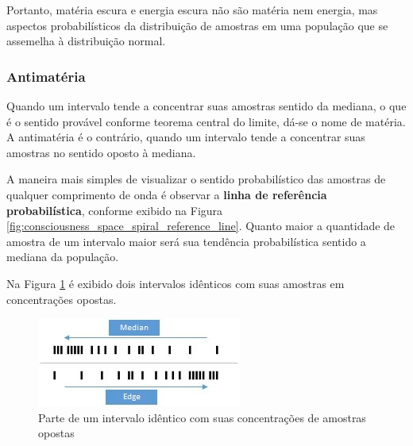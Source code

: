 Portanto, matéria escura e energia escura não são matéria nem energia, mas aspectos probabilísticos da distribuição de amostras em uma população que se assemelha à distribuição normal.

\subsubsection{Antimatéria}
Quando um intervalo tende a concentrar suas amostras sentido da mediana, o que é o sentido provável conforme teorema central do limite, dá-se o nome de matéria. A antimatéria é o contrário, quando um intervalo tende a concentrar suas amostras no sentido oposto à mediana. 

A maneira mais simples de visualizar o sentido probabilístico das amostras de qualquer comprimento de onda é observar a \textbf{linha de referência probabilística}, conforme exibido na Figura \ref{fig:consciousness_space_spiral_reference_line}. Quanto maior a quantidade de amostra de um intervalo maior será sua tendência probabilística sentido a mediana da população.

Na Figura \ref{fig:consciousness_concentration_of_opposite_samples} é exibido dois intervalos idênticos com suas amostras em concentrações opostas.
	\begin{figure}[H]
	\caption{Parte de um intervalo idêntico com suas concentrações de amostras opostas}
	\label{fig:consciousness_concentration_of_opposite_samples}
	\centering
	\includegraphics[scale=1.2]{sections/images/consciousness_concentration_of_opposite_samples.jpg}
	\end{figure}

